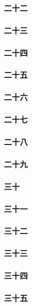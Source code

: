 \subsubsection*{二十二}
\subsubsection*{二十三}
\subsubsection*{二十四}
\subsubsection*{二十五}
\subsubsection*{二十六}
\subsubsection*{二十七}
\subsubsection*{二十八}
\subsubsection*{二十九}
\subsubsection*{三十}
\subsubsection*{三十一}
\subsubsection*{三十二}
\subsubsection*{三十三}
\subsubsection*{三十四}
\subsubsection*{三十五}







